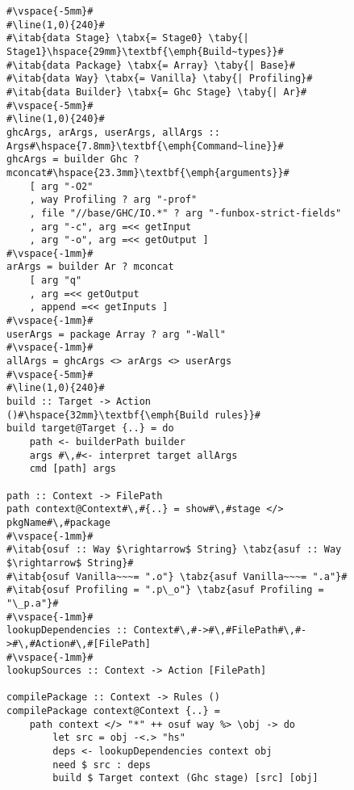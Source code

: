 \begin{figure}
\begin{lstlisting}
#\vspace{-5mm}#
#\line(1,0){240}#
#\itab{data Stage} \tabx{= Stage0} \taby{| Stage1}\hspace{29mm}\textbf{\emph{Build~types}}#
#\itab{data Package} \tabx{= Array} \taby{| Base}#
#\itab{data Way} \tabx{= Vanilla} \taby{| Profiling}#
#\itab{data Builder} \tabx{= Ghc Stage} \taby{| Ar}#
#\vspace{-5mm}#
#\line(1,0){240}#
ghcArgs, arArgs, userArgs, allArgs :: Args#\hspace{7.8mm}\textbf{\emph{Command~line}}#
ghcArgs = builder Ghc ? mconcat#\hspace{23.3mm}\textbf{\emph{arguments}}#
    [ arg "-O2"
    , way Profiling ? arg "-prof"
    , file "//base/GHC/IO.*" ? arg "-funbox-strict-fields" 
    , arg "-c", arg =<< getInput 
    , arg "-o", arg =<< getOutput ]
#\vspace{-1mm}#
arArgs = builder Ar ? mconcat
    [ arg "q"
    , arg =<< getOutput
    , append =<< getInputs ]
#\vspace{-1mm}#
userArgs = package Array ? arg "-Wall"
#\vspace{-1mm}#
allArgs = ghcArgs <> arArgs <> userArgs
#\vspace{-5mm}#
#\line(1,0){240}#
build :: Target -> Action ()#\hspace{32mm}\textbf{\emph{Build rules}}#
build target@Target {..} = do
    path <- builderPath builder
    args #\,#<- interpret target allArgs
    cmd [path] args

path :: Context -> FilePath
path context@Context#\,#{..} = show#\,#stage </> pkgName#\,#package
#\vspace{-1mm}#
#\itab{osuf :: Way $\rightarrow$ String} \tabz{asuf :: Way $\rightarrow$ String}#
#\itab{osuf Vanilla~~~= ".o"} \tabz{asuf Vanilla~~~= ".a"}#
#\itab{osuf Profiling = ".p\_o"} \tabz{asuf Profiling = "\_p.a"}#
#\vspace{-1mm}#
lookupDependencies :: Context#\,#->#\,#FilePath#\,#->#\,#Action#\,#[FilePath]
#\vspace{-1mm}#
lookupSources :: Context -> Action [FilePath]

compilePackage :: Context -> Rules ()
compilePackage context@Context {..} = 
    path context </> "*" ++ osuf way %> \obj -> do
        let src = obj -<.> "hs"
        deps <- lookupDependencies context obj
        need $ src : deps
        build $ Target context (Ghc stage) [src] [obj]


\end{lstlisting}
\end{figure}
